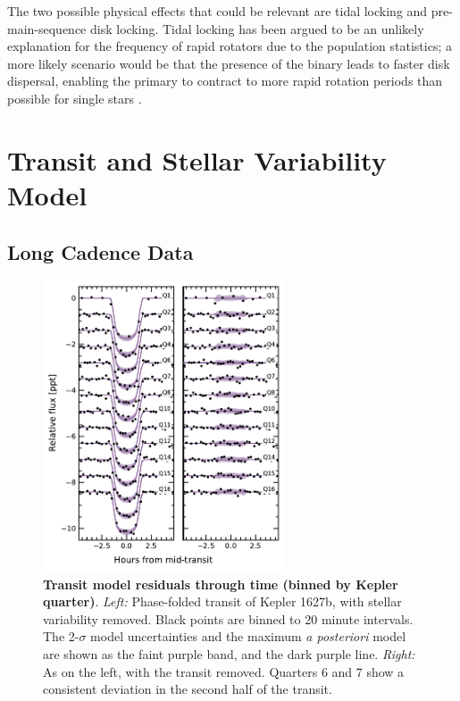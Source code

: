 \documentclass[12pt,modern,twocolumn,tighten]{aastex63}
\begin{document}
The two possible physical effects that could be relevant are tidal
locking and pre-main-sequence disk locking.  Tidal locking has been
argued to be an unlikely explanation for the frequency of rapid
rotators due to the population statistics; a more likely scenario
would be that the presence of the binary leads to faster disk
dispersal, enabling the primary to contract to more rapid rotation
periods than possible for single stars
\citep{meibom_effect_2007,bouma_cluster_2020}.



\section{Transit and Stellar Variability Model}
\label{app:gptransit}

\subsection{Long Cadence Data}
\begin{figure}[t]
	\begin{center}
		\leavevmode
		\includegraphics[width=0.64\textwidth]{f9.pdf}
	\end{center}
	\vspace{-0.7cm}
	\caption{
		{\bf Transit model residuals through time (binned by Kepler quarter)}.  
    {\it Left:}
    Phase-folded transit of Kepler 1627b, with stellar variability
    removed.  Black points are binned to 20
    minute intervals.  The 2-$\sigma$ model uncertainties and the
    maximum {\it a posteriori} model are shown as the faint purple
    band, and the dark purple line.
    {\it Right:}
    As on the left, with the transit removed.  Quarters 6 and 7 show a
    consistent deviation in the second half of the transit.
		\label{fig:phasequarter}
	}
\end{figure}
\end{document}
